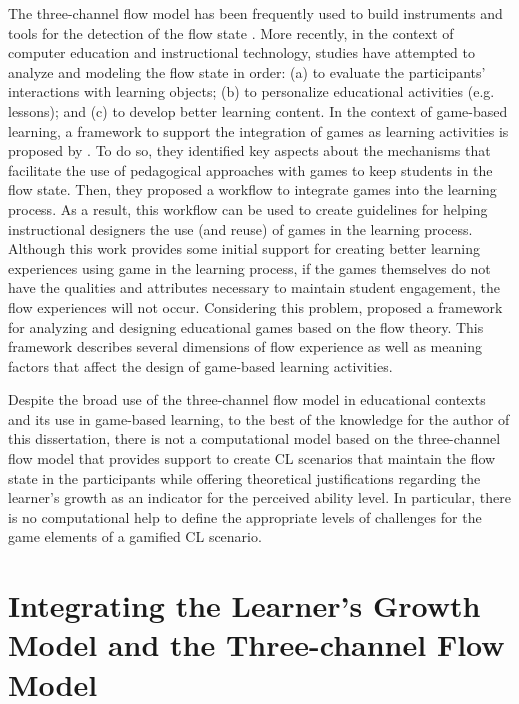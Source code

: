 The three-channel flow model has been frequently used to build instruments and tools for the detection of the flow state \cite{KortReillyPicard2001,PearceAinleyHoward2005,Esteban-MillatMartinez-LopezHuertas-GarciaMeseguerRodriguez-Ardura2014a,LeeJhengHsiao2014}. More recently, in the context of computer education and instructional technology, studies have attempted to analyze and modeling the flow state in order: (a) to evaluate the participants’ interactions with learning objects; (b) to personalize educational activities (e.g. lessons); and (c) to develop better learning content. In the context of game-based learning, a framework to support the integration of games as learning activities is proposed by . To do so, they identified key aspects about the mechanisms that facilitate the use of pedagogical approaches with games to keep students in the flow state. Then, they proposed a workflow to integrate games into the learning process. As a result, this workflow can be used to create guidelines for helping instructional designers the use (and reuse) of games in the learning process. Although this work provides some initial support for creating better learning experiences using game in the learning process, if the games themselves do not have the qualities and attributes necessary to maintain student engagement, the flow experiences will not occur. Considering this problem,  proposed a framework for analyzing and designing educational games based on the flow theory. This framework describes several dimensions of flow experience as well as meaning factors that affect the design of game-based learning activities.

Despite the broad use of the three-channel flow model in educational contexts and its use in game-based learning, to the best of the knowledge for the author of this dissertation, there is not a computational model based on the three-channel flow model that provides support to create CL scenarios that maintain the flow state in the participants while offering theoretical justifications regarding the learner’s growth as an indicator for the perceived ability level.
In particular, there is no computational help to define the appropriate levels of challenges for the game elements of a gamified CL scenario.

\section{Integrating the Learner’s Growth Model and the Three-channel Flow Model}
\label{sec:integrating-learners-growth-model-flow-theory}

